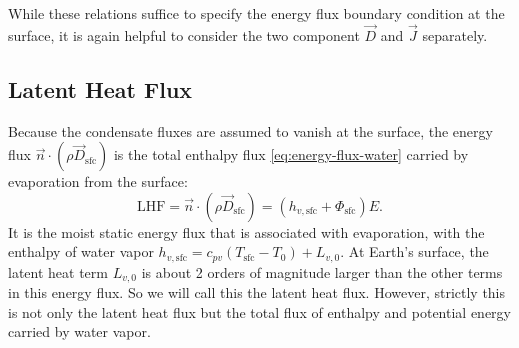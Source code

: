 \documentclass{report}
\begin{document}
While these relations suffice to specify the energy flux boundary condition at the surface, it is again helpful to consider the two component $\vec{D}$ and $\vec{J}$ separately. 

\subsection{Latent Heat Flux} Because the condensate fluxes are assumed to vanish at the surface, the energy flux $\vec{n} \cdot (\rho \vec{D}_{\mathrm{sfc}})$ is the total enthalpy flux \eqref{eq:energy-flux-water} carried by evaporation from the surface:
\begin{equation}\label{e:sfc_LHF}
     \mathrm{LHF} = \vec{n} \cdot (\rho \vec{D}_{\mathrm{sfc}})   = (h_{v, \mathrm{sfc}} + \Phi_\mathrm{sfc}) E.
\end{equation}
It is the moist static energy flux that is associated with evaporation, with the enthalpy of water vapor $h_{v, \mathrm{sfc}} = c_{pv} (T_\mathrm{sfc}-T_0) + L_{v,0}$. At Earth's surface, the latent heat term $L_{v,0}$ is about 2 orders of magnitude larger than the other terms in this energy flux. So we will call this the latent heat flux. However, strictly this is not only the latent heat flux but the total flux of enthalpy and potential energy carried by water vapor.
\end{document}
